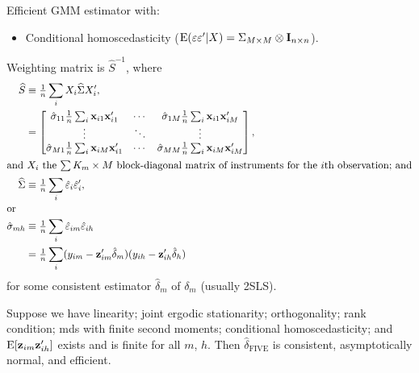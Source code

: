 \documentclass[8pt,letterpaper, landscape]{extarticle} %
\newcommand{\mx}{\ensuremath{\mathbf{x}}}
\newcommand{\mI}{\ensuremath{\mathbf{I}}}
\begin{document}
\begin{multicols}{3}
\begin{description}
 Efficient GMM estimator with:
\begin{itemize}
\item Conditional homoscedasticity ($ \E (\epsilon \epsilon' | X) = \Sigma_{M \times M} \otimes \mI_{n \times n} $).
\end{itemize}
Weighting matrix is $ \widehat{S}^{-1} $, where
\begin{align*}
\widehat{S} &\equiv \tfrac{1}{n}  \sum_{i} X_{i} \widehat{\Sigma} X_{i}', \\
&= \begin{bmatrix}
\hat{\sigma}_{11} \tfrac{1}{n} \sum_{i} \mx_{i1} \mx_{i1}' & \cdots & \hat{\sigma}_{1M} \tfrac{1}{n} \sum_{i} \mx_{i1} \mx_{iM}'  \\
\vdots & \ddots & \vdots \\
\hat{\sigma}_{M1} \tfrac{1}{n} \sum_{i} \mx_{iM} \mx_{i1}' & \cdots & \hat{\sigma}_{MM} \tfrac{1}{n} \sum_{i} \mx_{iM} \mx_{iM}'
\end{bmatrix}, \\
\intertext{and $ X_i $  the $ \sum K_m \times M $ block-diagonal matrix of instruments for the $ i $th observation; and}
\widehat{\Sigma} &\equiv \tfrac{1}{n} \sum_{i} \hat{\mathbf{\epsilon}}_{i} \hat{\mathbf{\epsilon}}_{i}' , \\
\intertext{or}
\hat{\sigma}_{mh} &\equiv \tfrac{1}{n} \sum_{i} \hat{\epsilon}_{im} \hat{\epsilon}_{ih} \\
&= \tfrac{1}{n} \sum_{i} (y_{im} - \mathbf{z}_{im}' \hat{\delta}_{m}) (y_{ih} - \mathbf{z}_{ih}' \hat{\delta}_{h})
\end{align*}
for some consistent estimator $ \hat{\delta}_{m} $ of $ \delta_{m} $ (usually 2SLS).

Suppose we have linearity; joint ergodic stationarity; orthogonality; rank condition; mds with finite second moments; conditional homoscedasticity; and $ \operatorname{E} [\mathbf{z}_{im} \mathbf{z}_{ih}'] $ exists and is finite for all $ m $, $ h $. Then $ \hat{\delta}_{\text{FIVE}} $ is consistent, asymptotically normal, and efficient.


\end{description}
\end{multicols}
\end{document}
